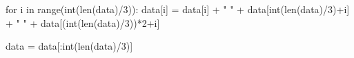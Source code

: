 \documentclass[
  letterpaper,
  DIV=11,
  numbers=noendperiod]{scrartcl}
\newenvironment{Shaded}{\begin{snugshade}}{\end{snugshade}}
\newcommand{\BuiltInTok}[1]{\textcolor[rgb]{0.00,0.23,0.31}{#1}}
\newcommand{\ControlFlowTok}[1]{\textcolor[rgb]{0.00,0.23,0.31}{#1}}
\newcommand{\DecValTok}[1]{\textcolor[rgb]{0.68,0.00,0.00}{#1}}
\newcommand{\KeywordTok}[1]{\textcolor[rgb]{0.00,0.23,0.31}{#1}}
\newcommand{\NormalTok}[1]{\textcolor[rgb]{0.00,0.23,0.31}{#1}}
\newcommand{\OperatorTok}[1]{\textcolor[rgb]{0.37,0.37,0.37}{#1}}
\newcommand{\StringTok}[1]{\textcolor[rgb]{0.13,0.47,0.30}{#1}}
\begin{document}
\begin{Shaded}
\begin{Highlighting}[]
\ControlFlowTok{for}\NormalTok{ i }\KeywordTok{in} \BuiltInTok{range}\NormalTok{(}\BuiltInTok{int}\NormalTok{(}\BuiltInTok{len}\NormalTok{(data)}\OperatorTok{/}\DecValTok{3}\NormalTok{)):}
\NormalTok{    data[i] }\OperatorTok{=}\NormalTok{ data[i] }\OperatorTok{+} \StringTok{" "} \OperatorTok{+}\NormalTok{ data[}\BuiltInTok{int}\NormalTok{(}\BuiltInTok{len}\NormalTok{(data)}\OperatorTok{/}\DecValTok{3}\NormalTok{)}\OperatorTok{+}\NormalTok{i] }\OperatorTok{+} \StringTok{" "} \OperatorTok{+}\NormalTok{ data[(}\BuiltInTok{int}\NormalTok{(}\BuiltInTok{len}\NormalTok{(data)}\OperatorTok{/}\DecValTok{3}\NormalTok{))}\OperatorTok{*}\DecValTok{2}\OperatorTok{+}\NormalTok{i]}
    
\NormalTok{data }\OperatorTok{=}\NormalTok{ data[:}\BuiltInTok{int}\NormalTok{(}\BuiltInTok{len}\NormalTok{(data)}\OperatorTok{/}\DecValTok{3}\NormalTok{)]}
\end{Highlighting}
\end{Shaded}
\end{document}
